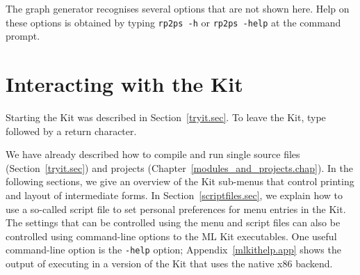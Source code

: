 \documentclass[12pt]{book}
\begin{document}
The graph generator recognises several options that are not shown
here. Help on these options is obtained by typing \texttt{rp2ps -h} or
%
{\tt rp2ps -help} at the command prompt.
%

\chapter{Interacting with the Kit}
\label{controlkit.sec}
\label{startup.sec}

Starting the Kit was described in Section~\ref{tryit.sec}.  To
%
%
%
leave the Kit, type 
%
 followed by a return character.

We have already described how to compile and run single source files
(Section~\ref{tryit.sec}) and projects
(Chapter~\ref{modules_and_projects.chap}).  In the following sections,
we give an overview of the Kit sub-menus that control printing and
layout of intermediate forms. In Section~\ref{scriptfiles.sec}, we
explain how to use a so-called script file to set personal preferences
for menu entries in the Kit. The settings that can be controlled using
the menu and script files can also be controlled using command-line
options to the ML Kit executables. One useful command-line option is
the 
%
{\tt -help} option; Appendix~\ref{mlkithelp.app} shows the output of
executing  in a version of the Kit that uses the
native x86 backend.



\end{document}
